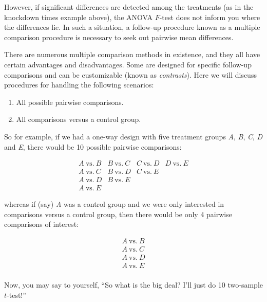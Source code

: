 \documentclass[
]{book}
\providecommand{\tightlist}{%
  \setlength{\itemsep}{0pt}\setlength{\parskip}{0pt}}
\begin{document}
However, if significant differences are detected among the treatments (as in the knockdown times example above), the ANOVA \(F\)-test does not inform you where the differences lie.
In such a situation, a follow-up procedure known as a multiple comparison procedure is necessary to seek out pairwise mean differences.

There are numerous multiple comparison methods in existence, and they all have certain advantages and disadvantages.
Some are designed for specific follow-up comparisons and can be customizable (known as \emph{contrasts}).
Here we will discuss procedures for handling the following scenarios:

\begin{enumerate}
\def\labelenumi{\arabic{enumi}.}
\tightlist
\item
  All possible pairwise comparisons.
\item
  All comparisons versus a control group.
\end{enumerate}

So for example, if we had a one-way design with five treatment groups \emph{A}, \emph{B}, \emph{C}, \emph{D} and \emph{E}, there would be 10 possible pairwise comparisons:

\[\begin{array}{cccc}
A~\textrm{vs.}~B & B~\textrm{vs.}~C & C~\textrm{vs.}~D & D~\textrm{vs.}~E \\
A~\textrm{vs.}~C & B~\textrm{vs.}~D & C~\textrm{vs.}~E &                  \\
A~\textrm{vs.}~D & B~\textrm{vs.}~E &                  &                  \\
A~\textrm{vs.}~E &                  &                  &                  
\end{array}\]

whereas if (say) \emph{A} was a control group and we were only interested in comparisons versus a control group, then there would be only 4 pairwise comparisons of interest:

\[\begin{array}{c}
A~\textrm{vs.}~B  \\
A~\textrm{vs.}~C  \\
A~\textrm{vs.}~D  \\
A~\textrm{vs.}~E  \\
\end{array}\]

Now, you may say to yourself, ``So what is the big deal? I'll just do 10 two-sample \(t\)-test!''
\end{document}

